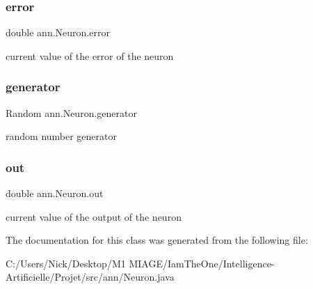 \subsubsection{\texorpdfstring{error}{error}}
{\footnotesize\ttfamily double ann.\+Neuron.\+error\hspace{0.3cm}{\ttfamily [protected]}}

current value of the error of the neuron \mbox{\label{classann_1_1_neuron_ac7d2bce61156cee5b79e960bf719ee6b}} 
\subsubsection{\texorpdfstring{generator}{generator}}
{\footnotesize\ttfamily Random ann.\+Neuron.\+generator\hspace{0.3cm}{\ttfamily [static]}}

random number generator \mbox{\label{classann_1_1_neuron_a50568ffff3bd8194ded913041414b244}} 
\subsubsection{\texorpdfstring{out}{out}}
{\footnotesize\ttfamily double ann.\+Neuron.\+out\hspace{0.3cm}{\ttfamily [protected]}}

current value of the output of the neuron 

The documentation for this class was generated from the following file\+:\begin{DoxyCompactItemize}
\item 
C\+:/\+Users/\+Nick/\+Desktop/\+M1 M\+I\+A\+G\+E/\+Iam\+The\+One/\+Intelligence-\/\+Artificielle/\+Projet/src/ann/Neuron.\+java\end{DoxyCompactItemize}
